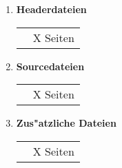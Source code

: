 \label{Quellcode}

\begin{center}
  \begin{minipage}[c]{8cm}
    \begin{enumerate}
    \item \textbf{Headerdateien}\\
      \begin{tabular}{p{4cm}r}
        & X Seiten
      \end{tabular}
    \item \textbf{Sourcedateien}\\
      \begin{tabular}{p{4cm}r}
        & X Seiten\\
      \end{tabular}
    \item \textbf{Zus"atzliche Dateien}\\
      \begin{tabular}{p{4cm}r}
        & X Seiten\\
      \end{tabular}
    \end{enumerate}
  \end{minipage}
\end{center}
\clearpage
\lhead{}
\ 

